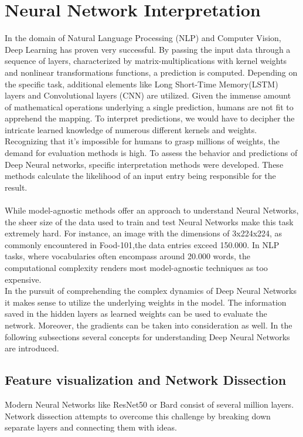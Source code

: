 \section{Neural Network Interpretation}
\label{sec:nni}
In the domain of Natural Language Processing (NLP) and Computer Vision, Deep Learning has proven very successful. By passing the input data through a sequence of layers, characterized by matrix-multiplications with kernel weights and nonlinear transformations functions, a prediction is computed. Depending on the specific task, additional elements like Long Short-Time Memory(LSTM) layers and Convolutional layers (CNN) are utilized. Given the immense amount of mathematical operations underlying a single prediction, humans are not fit to apprehend the mapping. To interpret predictions, we would have to decipher the intricate learned knowledge of numerous different kernels and weights.
Recognizing that it's impossible for humans to grasp millions of weights, the demand for evaluation methods is high. To assess the behavior and predictions of Deep Neural networks, specific interpretation methods were developed. These methods calculate the likelihood of an input entry being responsible for the result.
\\\\
While model-agnostic methods offer an approach to understand Neural Networks, the sheer size of the data used to train and test Neural Networks make this task extremely hard. For instance, an image with the dimensions of 3x224x224, as commonly encountered in Food-101,the data entries exceed 150.000. In NLP tasks, where vocabularies often encompass around 20.000 words, the computational complexity renders most model-agnostic techniques as too expensive.
\\
In the pursuit of comprehending the complex dynamics of Deep Neural Networks it makes sense to utilize the underlying weights in the model. The information saved in the hidden layers  as learned weights can be used to evaluate the network. Moreover, the gradients can be taken into consideration as well.
In the following subsections several concepts for understanding Deep Neural Networks are introduced. 


\subsection{Feature visualization and Network Dissection \cite{olah2017feature}}
\label{sec:network_dissection}
Modern Neural Networks like ResNet50 or Bard consist of several million layers. Network dissection attempts to overcome this challenge by breaking down separate layers and connecting them with ideas. 

